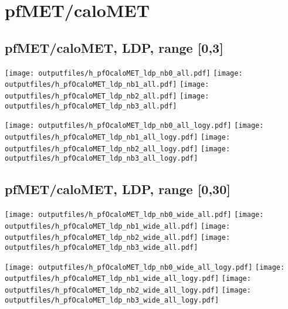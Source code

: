 \documentclass[11pt]{article}
\begin{document}
    \clearpage





   \section{ pfMET/caloMET}

    \subsection{ pfMET/caloMET, LDP, range [0,3]}

    \noindent
     \texttt{[image: outputfiles/h\_pfOcaloMET\_ldp\_nb0\_all.pdf]}
     \texttt{[image: outputfiles/h\_pfOcaloMET\_ldp\_nb1\_all.pdf]}
     \texttt{[image: outputfiles/h\_pfOcaloMET\_ldp\_nb2\_all.pdf]}
     \texttt{[image: outputfiles/h\_pfOcaloMET\_ldp\_nb3\_all.pdf]}

    \noindent
     \texttt{[image: outputfiles/h\_pfOcaloMET\_ldp\_nb0\_all\_logy.pdf]}
     \texttt{[image: outputfiles/h\_pfOcaloMET\_ldp\_nb1\_all\_logy.pdf]}
     \texttt{[image: outputfiles/h\_pfOcaloMET\_ldp\_nb2\_all\_logy.pdf]}
     \texttt{[image: outputfiles/h\_pfOcaloMET\_ldp\_nb3\_all\_logy.pdf]}

    \clearpage



    \subsection{ pfMET/caloMET, LDP, range [0,30]}

    \noindent
     \texttt{[image: outputfiles/h\_pfOcaloMET\_ldp\_nb0\_wide\_all.pdf]}
     \texttt{[image: outputfiles/h\_pfOcaloMET\_ldp\_nb1\_wide\_all.pdf]}
     \texttt{[image: outputfiles/h\_pfOcaloMET\_ldp\_nb2\_wide\_all.pdf]}
     \texttt{[image: outputfiles/h\_pfOcaloMET\_ldp\_nb3\_wide\_all.pdf]}

    \noindent
     \texttt{[image: outputfiles/h\_pfOcaloMET\_ldp\_nb0\_wide\_all\_logy.pdf]}
     \texttt{[image: outputfiles/h\_pfOcaloMET\_ldp\_nb1\_wide\_all\_logy.pdf]}
     \texttt{[image: outputfiles/h\_pfOcaloMET\_ldp\_nb2\_wide\_all\_logy.pdf]}
     \texttt{[image: outputfiles/h\_pfOcaloMET\_ldp\_nb3\_wide\_all\_logy.pdf]}
\end{document}
